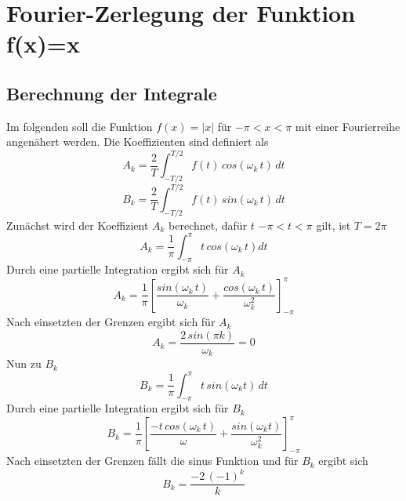 \section{Fourier-Zerlegung der Funktion f(x)=x }
\subsection{Berechnung der Integrale}
    Im folgenden soll die Funktion $f(x)=|x|$ für $-\pi < x < \pi$ mit einer Fourierreihe angenähert werden.
    Die Koeffizienten sind definiert als
\begin{equation}
  A_k=\frac{2}{T} \int_{-T/2}^{T/2} f(t) \, cos(\omega_k \, t) \,  dt
\end{equation}
\begin{equation}
  B_k=\frac{2}{T} \int_{-T/2}^{T/2} f(t) \, sin(\omega_k \, t) \, dt
\end{equation}
  Zunächst wird der Koeffizient $A_k$ berechnet, dafür $t$  $-\pi < t < \pi$ gilt, ist $T = 2\pi$
\begin{equation}
  A_k = \frac{1}{\pi} \int_{-\pi}^{\pi} t \, cos(\omega_k\, t) dt
\end{equation}
  Durch eine partielle Integration ergibt sich für $A_k$
\begin{equation}
  A_k= \frac{1}{\pi} \left [\frac{sin(\omega_k \, t)}{\omega_k} + \frac{cos(\omega_k \, t)}{\omega_k^2}  \right]_{-\pi}^{\pi} 
\end{equation}
  Nach einsetzten der Grenzen ergibt sich für $A_k$
\begin{equation}
  A_k = \frac{2 \, sin(\pi k)}{\omega_k} = 0
\end{equation}
  Nun zu $B_k$
\begin{equation}
  B_k = \frac{1}{\pi} \int_{-\pi}^{\pi} t \, sin (\omega_k t) \, dt
\end{equation}
  Durch eine partielle Integration ergibt sich für $B_k$
\begin{equation}
  B_k = \frac{1}{\pi} \left [\frac{- t \, cos(\omega_k \,  t)}{\omega} + \frac{sin(\omega_k t)}{\omega_k^2}\right]_{-\pi}^{\pi} 
\end{equation}
  Nach einsetzten der Grenzen fällt die sinus Funktion und für $B_k$ ergibt sich
\begin{equation}
  B_k = \frac{-2 \, (-1)^k}{k}
\end{equation}
